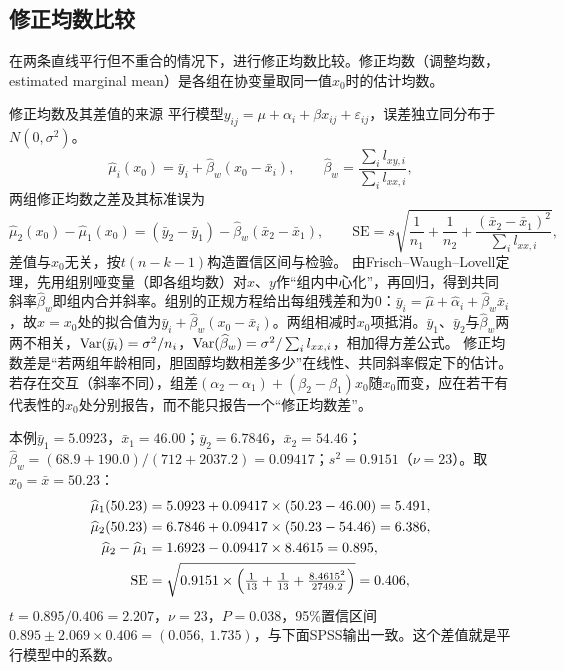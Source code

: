 \subsection{修正均数比较}
在两条直线平行但不重合的情况下，进行修正均数比较。修正均数（调整均数，estimated marginal mean）是各组在协变量取同一值$x_0$时的估计均数。
\begin{derivation}{修正均数及其差值的来源}
平行模型$y_{ij}=\mu+\alpha_i+\beta x_{ij}+\varepsilon_{ij}$，误差独立同分布于$N(0,\sigma^2)$。
\[
\widehat\mu_i(x_0)=\bar y_i+\widehat\beta_w(x_0-\bar x_i),\qquad
\widehat\beta_w=\frac{\sum_i l_{xy,i}}{\sum_i l_{xx,i}},
\]
两组修正均数之差及其标准误为
\[
\widehat\mu_2(x_0)-\widehat\mu_1(x_0)=(\bar y_2-\bar y_1)-\widehat\beta_w(\bar x_2-\bar x_1),\qquad
\mathrm{SE}=s\sqrt{\frac1{n_1}+\frac1{n_2}+\frac{(\bar x_2-\bar x_1)^2}{\sum_il_{xx,i}}},
\]
差值与$x_0$无关，按$t(n-k-1)$构造置信区间与检验。
由Frisch--Waugh--Lovell定理，先用组别哑变量（即各组均数）对$x$、$y$作“组内中心化”，再回归，得到共同斜率$\widehat\beta_w$即组内合并斜率。组别的正规方程给出每组残差和为0：$\bar y_i=\widehat\mu+\widehat\alpha_i+\widehat\beta_w\bar x_i$，故$x=x_0$处的拟合值为$\bar y_i+\widehat\beta_w(x_0-\bar x_i)$。两组相减时$x_0$项抵消。$\bar y_1$、$\bar y_2$与$\widehat\beta_w$两两不相关，$\operatorname{Var}(\bar y_i)=\sigma^2/n_i$，$\operatorname{Var}(\widehat\beta_w)=\sigma^2/\sum_il_{xx,i}$，相加得方差公式。
修正均数差是“若两组年龄相同，胆固醇均数相差多少”在线性、共同斜率假定下的估计。若存在交互（斜率不同），组差$(\alpha_2-\alpha_1)+(\beta_2-\beta_1)x_0$随$x_0$而变，应在若干有代表性的$x_0$处分别报告，而不能只报告一个“修正均数差”。
\end{derivation}
本例$\bar y_1=5.0923$，$\bar x_1=46.00$；$\bar y_2=6.7846$，$\bar x_2=54.46$；$\widehat\beta_w=(68.9+190.0)/(712+2037.2)=0.09417$；$s^2=0.9151$（$\nu=23$）。取$x_0=\bar x=50.23$：
\begin{align*}
\widehat\mu_1(50.23)&=5.0923+0.09417\times(50.23-46.00)=5.491,\\
\widehat\mu_2(50.23)&=6.7846+0.09417\times(50.23-54.46)=6.386,\\
\widehat\mu_2-\widehat\mu_1&=1.6923-0.09417\times8.4615=0.895,\\
\mathrm{SE}&=\sqrt{0.9151\times\Bigl(\tfrac1{13}+\tfrac1{13}+\tfrac{8.4615^2}{2749.2}\Bigr)}=0.406,
\end{align*}
$t=0.895/0.406=2.207$，$\nu=23$，$P=0.038$，95\%置信区间$0.895\pm2.069\times0.406=(0.056,\ 1.735)$，与下面SPSS输出一致。这个差值就是平行模型中的系数。

